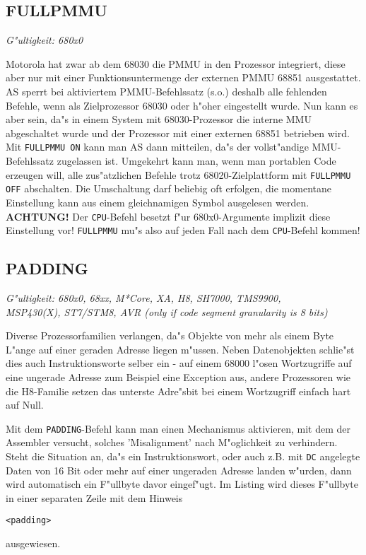 \documentclass[12pt,a4paper,twoside]{report}
\makeatletter
\newcommand{\bb}[1]{{\bf #1}}
\newcommand{\tty}[1]{{\tt #1}}
\newcommand{\ttindex}[1]{\index{#1@{\tt #1}}}
\makeatother
\begin{document}

\subsection{FULLPMMU}
\ttindex{FULLPMMU}

{\em G"ultigkeit: 680x0}

Motorola hat zwar ab dem 68030 die PMMU in den Prozessor integriert,
diese aber nur mit einer Funktionsuntermenge der externen PMMU 68851
ausgestattet.  AS sperrt bei aktiviertem PMMU-Befehlssatz (s.o.) deshalb
alle fehlenden Befehle, wenn als Zielprozessor 68030 oder h"oher
eingestellt wurde.  Nun kann es aber sein, da"s in einem System mit
68030-Prozessor die interne MMU abgeschaltet wurde und der Prozessor
mit einer externen 68851 betrieben wird.  Mit \tty{FULLPMMU ON} kann man
AS dann mitteilen, da"s der vollst"andige MMU-Befehlssatz zugelassen
ist.  Umgekehrt kann man, wenn man portablen Code erzeugen will, alle
zus"atzlichen Befehle trotz 68020-Zielplattform mit \tty{FULLPMMU OFF}
abschalten.  Die Umschaltung darf beliebig oft erfolgen, die momentane
Einstellung kann aus einem gleichnamigen Symbol ausgelesen werden.
\bb{ACHTUNG!}  Der \tty{CPU}-Befehl besetzt f"ur 680x0-Argumente implizit
diese Einstellung vor!  \tty{FULLPMMU} mu"s also auf jeden Fall nach dem
\tty{CPU}-Befehl kommen!


\subsection{PADDING}
\ttindex{PADDING}

{\em G"ultigkeit: 680x0, 68xx, M*Core, XA, H8, SH7000, TMS9900,\\
     MSP430(X), ST7/STM8, AVR (only if code segment granularity
     is 8 bits)}

Diverse Prozessorfamilien verlangen, da"s Objekte von mehr als einem
Byte L"ange auf einer geraden Adresse liegen m"ussen.  Neben Datenobjekten
schlie"st dies auch Instruktionsworte selber ein - auf einem 68000
l"osen Wortzugriffe auf eine ungerade Adresse zum Beispiel eine
Exception aus, andere Prozessoren wie die H8-Familie setzen das
unterste Adre"sbit bei einem Wortzugriff einfach hart auf Null.

Mit dem \tty{PADDING}-Befehl kann man einen Mechanismus aktivieren,
mit dem der Assembler versucht, solches 'Misalignment' nach M"oglichkeit
zu verhindern.  Steht die Situation an, da"s ein Instruktionswort,
oder auch z.B. mit \tty{DC} angelegte Daten von 16 Bit oder mehr auf
einer ungeraden Adresse landen w"urden, dann wird automatisch ein F"ullbyte
davor eingef"ugt.  Im Listing wird dieses F"ullbyte in einer separaten
Zeile mit dem Hinweis
\begin{verbatim}
<padding>
\end{verbatim}
ausgewiesen.
\end{document}
